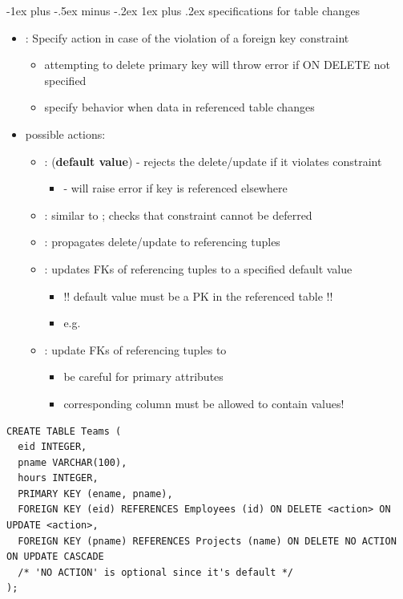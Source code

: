 \documentclass[10pt, landscape]{article}
\makeatletter
\renewcommand{\subsubsection}{\@startsection{subsubsection}{3}{0mm}%
  {-1ex plus -.5ex minus -.2ex}%
  {1ex plus .2ex}%
{\normalfont\small\bfseries}}%
\makeatother
\begin{document}
\begin{multicols}{3}
  \subsubsection{specifications for table changes}
  \begin{itemize}
    \item {}: Specify action in case of the violation of a foreign key constraint
      \begin{itemize}
        \item attempting to delete primary key will throw error if ON DELETE not specified
        \item specify behavior when data in referenced table changes
      \end{itemize}
    \item possible actions:
      \begin{itemize}
        \item {}: (\textbf{default value}) - rejects the delete/update if it violates constraint
          \begin{itemize}
            \item {} - will raise error if key is referenced elsewhere
          \end{itemize}
        \item {}: similar to ; checks that constraint cannot be deferred
        \item {}: propagates delete/update to referencing tuples
        \item {}: updates FKs of referencing tuples to a specified default value
          \begin{itemize}
            \item !! default value must be a PK in the referenced table !!
            \item e.g. 
          \end{itemize}
        \item {}: update FKs of referencing tuples to 
          \begin{itemize}
            \item be careful for primary attributes
            \item corresponding column must be allowed to contain  values!
          \end{itemize}
      \end{itemize}
  \end{itemize}
  \begin{lstlisting}[style=mySQL]
CREATE TABLE Teams (
  eid INTEGER,
  pname VARCHAR(100),
  hours INTEGER,
  PRIMARY KEY (ename, pname),
  FOREIGN KEY (eid) REFERENCES Employees (id) ON DELETE <action> ON UPDATE <action>,
  FOREIGN KEY (pname) REFERENCES Projects (name) ON DELETE NO ACTION ON UPDATE CASCADE 
  /* 'NO ACTION' is optional since it's default */
);
  \end{lstlisting}


\end{multicols}
\end{document}
